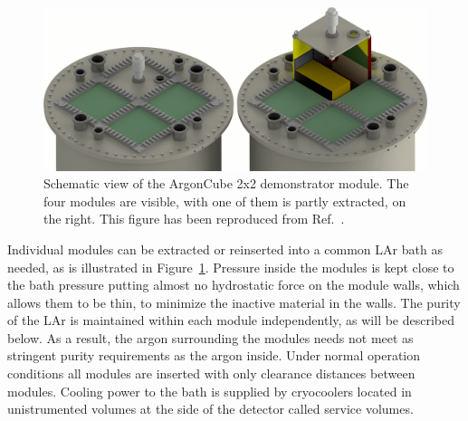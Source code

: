 \begin{figure}[htbp]
\centering
\includegraphics[width=\textwidth]{plots/DualBath.png}
\caption{Schematic view of the ArgonCube 2x2 demonstrator module. The four modules are visible, with one of them is partly extracted, on the right. This figure has been reproduced from Ref.~\cite{argoncube_loi}.}
\label{fig:2x2_extraction}
\end{figure}
Individual modules can be extracted or reinserted into a common LAr bath as needed, as is illustrated in Figure~\ref{fig:2x2_extraction}. Pressure inside the modules is kept close to the bath pressure putting almost no hydrostatic force on the module walls, which allows them to be thin, to minimize the inactive material in the walls. The purity of the LAr is maintained within each module independently, as will be described below. As a result, the argon surrounding the modules needs not meet as stringent purity requirements as the argon inside. Under normal operation conditions all modules are inserted with only clearance distances between modules. Cooling power to the bath is supplied by cryocoolers located in unistrumented volumes at the side of the detector called service volumes.

